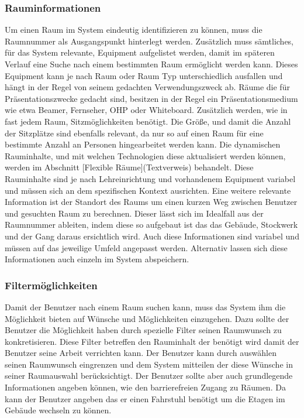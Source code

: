 \subsubsection{Rauminformationen}
\label{sec:Rauminformation}

Um einen Raum im System eindeutig identifizieren zu können, muss die Raumnummer
als Ausgangspunkt hinterlegt werden. Zusätzlich muss sämtliches, für das System
relevante, Equipment aufgelistet werden, damit im späteren Verlauf eine Suche
nach einem bestimmten Raum ermöglicht werden kann. Dieses Equipment kann je
nach Raum oder Raum Typ unterschiedlich ausfallen und hängt in der Regel von
seinem gedachten Verwendungszweck ab. Räume die für Präsentationszwecke gedacht
sind, besitzen in der Regel ein Präsentationsmedium wie etwa Beamer, Fernseher,
OHP oder Whiteboard. Zusätzlich werden, wie in fast jedem Raum,
Sitzmöglichkeiten benötigt. Die Größe, und damit die Anzahl der Sitzplätze sind
ebenfalls relevant, da nur so auf einen Raum für eine bestimmte Anzahl an
Personen hingearbeitet werden kann. Die dynamischen Rauminhalte, und mit
welchen Technologien diese aktualisiert werden können, werden im Abschnitt
[Flexible Räume](Textverweis) behandelt. Diese Rauminhalte sind je nach
Lehreinrichtung und vorhandenem Equipment variabel und müssen sich an dem
spezifischen Kontext ausrichten. Eine weitere relevante Information ist der
Standort des Raums um einen kurzen Weg zwischen Benutzer und gesuchten Raum zu
berechnen. Dieser lässt sich im Idealfall aus der Raumnummer ableiten, indem
diese so aufgebaut ist das das Gebäude, Stockwerk und der Gang daraus
ersichtlich wird. Auch diese Informationen sind variabel und müssen auf das
jeweilige Umfeld angepasst werden. Alternativ lassen sich diese Informationen
auch einzeln im System abspeichern.

\subsubsection{Filtermöglichkeiten}
\label{sec:Filtermöglichkeiten}

Damit der Benutzer nach einem Raum suchen kann, muss das System ihm die
Möglichkeit bieten auf Wünsche und Möglichkeiten einzugehen. Dazu sollte der
Benutzer die Möglichkeit haben durch spezielle Filter seinen Raumwunsch zu
konkretisieren. Diese Filter betreffen \zB den Rauminhalt der benötigt wird
damit der Benutzer seine Arbeit verrichten kann. Der Benutzer kann durch
auswählen seinen Raumwunsch eingrenzen und dem System mitteilen der diese
Wünsche in seiner Raumauswahl berücksichtigt. Der Benutzer sollte aber auch 
grundlegende Informationen angeben können, wie \zB den barrierefreien Zugang
zu Räumen. Da kann der Benutzer \zB angeben das er einen Fahrstuhl benötigt um
die Etagen im Gebäude wechseln zu können.

